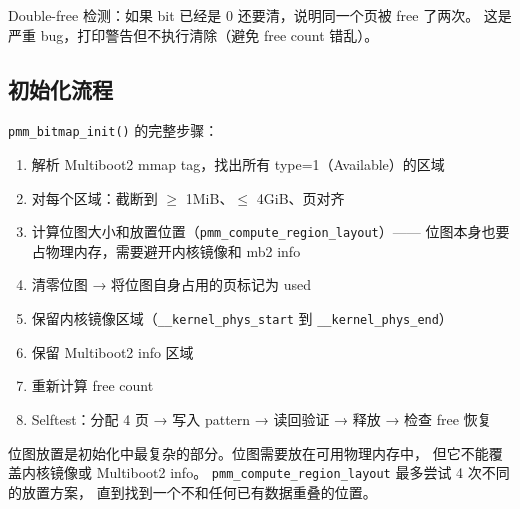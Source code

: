 \begin{warnbox}
Double-free 检测：如果 bit 已经是 0 还要清，说明同一个页被 free 了两次。
这是严重 bug，打印警告但不执行清除（避免 free count 错乱）。
\end{warnbox}

\subsection{初始化流程}

\texttt{pmm\_bitmap\_init()} 的完整步骤：

\begin{enumerate}
  \item 解析 Multiboot2 mmap tag，找出所有 type=1（Available）的区域
  \item 对每个区域：截断到 $\ge$ 1MiB、$\le$ 4GiB、页对齐
  \item 计算位图大小和放置位置（\texttt{pmm\_compute\_region\_layout}）——
    位图本身也要占物理内存，需要避开内核镜像和 mb2 info
  \item 清零位图 → 将位图自身占用的页标记为 used
  \item 保留内核镜像区域（\texttt{\_\_kernel\_phys\_start} 到 \texttt{\_\_kernel\_phys\_end}）
  \item 保留 Multiboot2 info 区域
  \item 重新计算 free count
  \item Selftest：分配 4 页 → 写入 pattern → 读回验证 → 释放 → 检查 free 恢复
\end{enumerate}

\begin{designbox}
位图放置是初始化中最复杂的部分。位图需要放在可用物理内存中，
但它不能覆盖内核镜像或 Multiboot2 info。
\texttt{pmm\_compute\_region\_layout} 最多尝试 4 次不同的放置方案，
直到找到一个不和任何已有数据重叠的位置。
\end{designbox}



